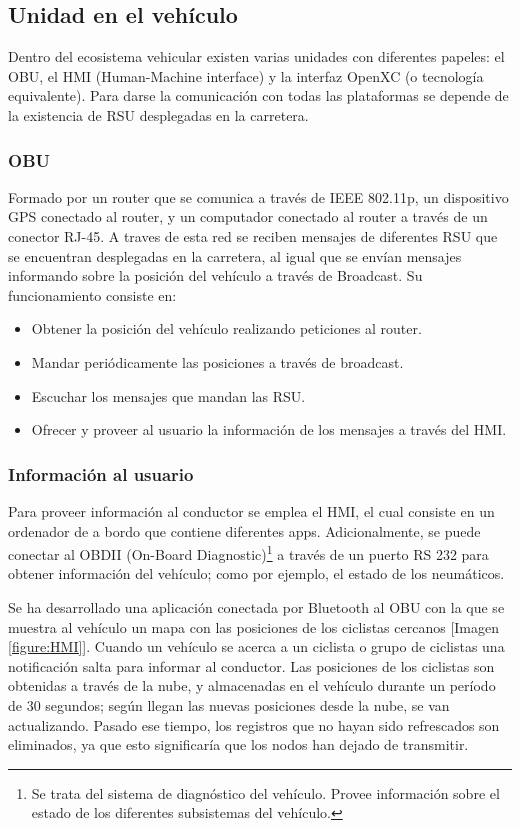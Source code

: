 \subsection{Unidad en el vehículo}
Dentro del ecosistema vehicular existen varias unidades con diferentes papeles: el OBU, el HMI (Human-Machine interface) y la interfaz OpenXC (o tecnología equivalente). Para darse la comunicación con todas las plataformas se depende de la existencia de RSU desplegadas en la carretera.

	\subsubsection{OBU}
	Formado por un router que se comunica a través de IEEE 802.11p, un dispositivo GPS conectado al router, y un computador conectado al router a través de un conector RJ-45. A traves de esta red se reciben mensajes de diferentes RSU que se encuentran desplegadas en la carretera, al igual que se envían mensajes informando sobre la posición del vehículo a través de Broadcast. Su funcionamiento consiste en:
	\begin{itemize}
		\item Obtener la posición del vehículo realizando peticiones al router.
		\item Mandar periódicamente las posiciones a través de broadcast.
		\item Escuchar los mensajes que mandan las RSU.
		\item Ofrecer y proveer al usuario la información de los mensajes a través del HMI.
	\end{itemize}
	
	\subsubsection{Información al usuario}
	Para proveer información al conductor se emplea el HMI, el cual consiste en un ordenador de a bordo que contiene diferentes apps. Adicionalmente, se puede conectar al OBDII (On-Board Diagnostic)\footnote{Se trata del sistema de diagnóstico del vehículo. Provee información sobre el estado de los diferentes subsistemas del vehículo.} a través de un puerto RS 232 para obtener información del vehículo; como por ejemplo, el estado de los neumáticos.
	
	Se ha desarrollado una aplicación conectada por Bluetooth al OBU con la que se muestra al vehículo un mapa con las posiciones de los ciclistas cercanos [Imagen \ref{figure:HMI}]. Cuando un vehículo se acerca a un ciclista o grupo de ciclistas una notificación salta para informar al conductor. Las posiciones de los ciclistas son obtenidas a través de la nube, y almacenadas en el vehículo durante un período de 30 segundos; según llegan las nuevas posiciones desde la nube, se van actualizando. Pasado ese tiempo, los registros que no hayan sido refrescados son eliminados, ya que esto significaría que los nodos han dejado de transmitir.
	
